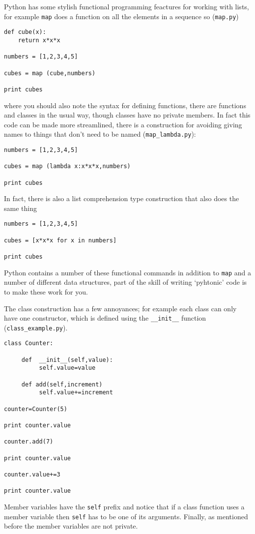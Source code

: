 \documentclass[11pt,a4paper]{scrartcl}
\begin{document}
Python has some stylish functional programming feactures for working
with lists, for example \texttt{map} does a function on all the
elements in a sequence so (\texttt{map.py})
\begin{lstlisting}[numbers=right]
def cube(x):
    return x*x*x

numbers = [1,2,3,4,5]

cubes = map (cube,numbers)

print cubes
\end{lstlisting}
where you should also note the syntax for defining functions, there
are functions and classes in the usual way, though classes have no
private members. In fact this code can be made more streamlined, there
is a construction for avoiding giving names to things that don't need
to be named  (\texttt{map\_lambda.py}):
\begin{lstlisting}[numbers=right]
numbers = [1,2,3,4,5]

cubes = map (lambda x:x*x*x,numbers)

print cubes
\end{lstlisting}
In fact, there is also a list comprehension type construction that also does the same thing
\begin{lstlisting}[numbers=right]
numbers = [1,2,3,4,5]

cubes = [x*x*x for x in numbers]

print cubes
\end{lstlisting}

Python contains a number of these functional commands in addition to
\texttt{map} and a number of different data structures, part of the
skill of writing \lq{}pyhtonic\rq{} code is to make these work for
you.

The class construction has a few annoyances; for example each class
can only have one constructor, which is defined using the
\texttt{\_\_init\_\_} function  (\texttt{class\_example.py}).
\begin{lstlisting}[numbers=right]
class Counter:

     def  __init__(self,value):
          self.value=value

     def add(self,increment)
          self.value+=increment

counter=Counter(5)

print counter.value

counter.add(7)

print counter.value

counter.value+=3

print counter.value

\end{lstlisting}
Member variables have the \texttt{self} prefix and notice that if a
class function uses a member variable then \texttt{self} has to be one
of its arguments. Finally, as mentioned before the member variables
are not private.
\end{document}
